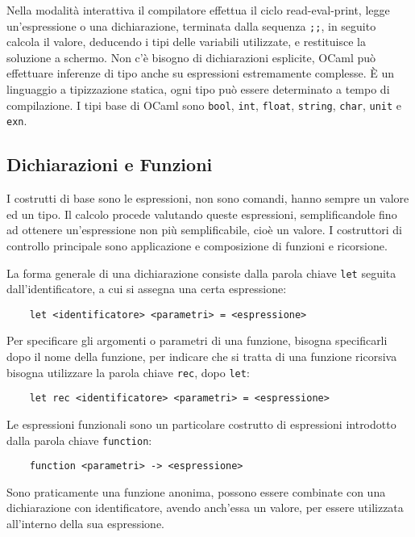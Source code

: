 \documentclass{article}
\numberwithin{equation}{subsection}
\begin{document}
Nella modalità interattiva il compilatore effettua il ciclo read-eval-print, legge un'espressione o una dichiarazione, terminata dalla sequenza \verb|;;|, in seguito calcola il valore, deducendo i tipi delle variabili utilizzate, e restituisce la soluzione a schermo. 
Non c'è bisogno di dichiarazioni esplicite, OCaml può effettuare inferenze di tipo anche su espressioni estremamente complesse. È un linguaggio a tipizzazione statica, ogni tipo può essere determinato a tempo di compilazione. I tipi base di OCaml sono \verb|bool|, \verb|int|, \verb|float|, \verb|string|, \verb|char|, \verb|unit| e \verb|exn|. 

\subsection{Dichiarazioni e Funzioni}

I costrutti di base sono le espressioni, non sono comandi, hanno sempre un valore ed un tipo. Il calcolo procede valutando queste espressioni, semplificandole fino ad ottenere un'espressione non più semplificabile, cioè un valore. I costruttori di controllo principale sono applicazione e composizione di funzioni e ricorsione. 

La forma generale di una dichiarazione consiste dalla parola chiave \verb|let| seguita dall'identificatore, a cui si assegna una certa espressione:
\begin{verbatim}
    let <identificatore> <parametri> = <espressione>
\end{verbatim}

Per specificare gli argomenti o parametri di una funzione, bisogna specificarli dopo il nome della funzione, per indicare che si tratta di una funzione ricorsiva bisogna utilizzare la parola chiave \verb|rec|, dopo \verb|let|:
\begin{verbatim}
    let rec <identificatore> <parametri> = <espressione>
\end{verbatim}

Le espressioni funzionali sono un particolare costrutto di espressioni introdotto dalla parola chiave \verb|function|:
\begin{verbatim}
    function <parametri> -> <espressione>
\end{verbatim}
Sono praticamente una funzione anonima, possono essere combinate con una dichiarazione con identificatore, avendo anch'essa un valore, per essere utilizzata all'interno della sua espressione. 
\end{document}
